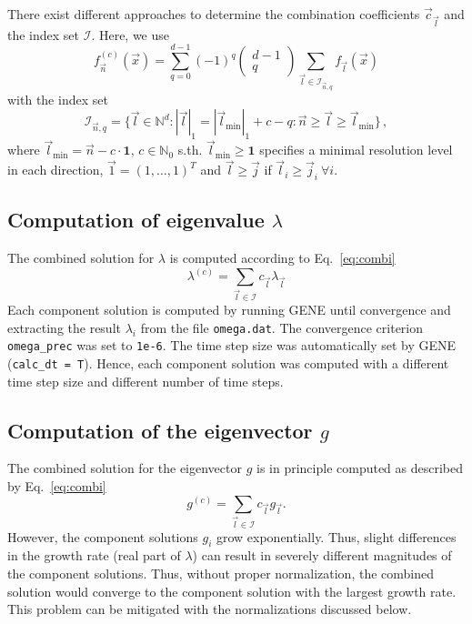 \documentclass{scrartcl}
\begin{document}
There exist different approaches to determine the combination coefficients $\vec c_{\vec{l}}$ and the index set $\mathcal I$.
Here, we use
\begin{equation}
	f_{\vec n}^{(c)}(\vec x) = \sum_{q=0}^{d-1}(-1)^q
	\begin{pmatrix}
		d-1\\q
	\end{pmatrix}
	\sum_{\vec l \in \mathcal I_{\vec n,q}}f_{\vec l}(\vec x)
	\label{eq:combi}
\end{equation}
with the index set
\begin{equation}
	\mathcal I_{\vec n,q} = \{\vec l \in \mathbb N^d:|\vec l|_1= |\vec l_{\text{min}}|_1+c-q : \vec n \geq \vec l \geq \vec l_\text{min}\}\,,
	\label{eq:index_classic}
\end{equation}
where $\vec l_{\text{min}} = \vec n - c\cdot\mathbf{1}$, $c \in \mathbb N_0$ s.th. $\vec l_\text{min} \geq \mathbf{1}$ specifies a minimal resolution level in each direction, $\vec 1 = (1,\dots,1)^T$ and $\vec l \geq \vec j$ if $\vec l_i \geq \vec j_i~ \forall i$.

\subsection{Computation of eigenvalue $\lambda$}

The combined solution for $\lambda$ is computed according to Eq.~\eqref{eq:combi}
\begin{equation}
	\lambda^{(c)} = \sum_{\vec l \in \mathcal I} c_{\vec l} \lambda_{\vec l}
\end{equation} 
Each component solution is computed by running GENE until convergence and extracting the result $\lambda_i$ from the file \texttt{omega.dat}. The convergence criterion \texttt{omega\_prec} was set to \texttt{1e-6}. The time step size was automatically set by GENE (\texttt{calc\_dt = T}). Hence, each component solution was computed with a different time step size and different number of time 
steps.

\subsection{Computation of the eigenvector $g$}

The combined solution for the eigenvector $g$ is in principle computed as described by Eq.~\eqref{eq:combi}
\begin{equation}
	g^{(c)} = \sum_{\vec l \in \mathcal I} c_{\vec l} g_{\vec l}.
	\label{eq:combi_eigenvector}
\end{equation}
However, the component solutions $g_i$ grow exponentially. Thus, slight differences in the growth rate (real part of $\lambda$) can result in severely different magnitudes of the component solutions. Thus, without proper normalization, the combined solution would converge to the component solution with the largest growth rate. This problem can be mitigated with the normalizations discussed below.
\end{document}
